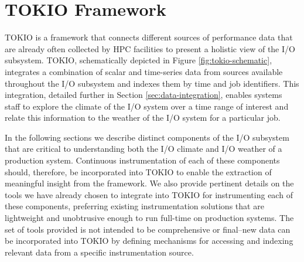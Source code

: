 \section{TOKIO Framework} \label{sec:methods}

TOKIO is a framework that connects different sources of performance data that are already often collected by HPC facilities to present a holistic view of the I/O subsystem.
TOKIO, schematically depicted in Figure \ref{fig:tokio-schematic}, integrates a combination of scalar and time-series data from sources available throughout the I/O subsystem and indexes them by time and job identifiers.
This integration, detailed further in Section
\ref{sec:data-integration}, enables systems staff to explore the
climate of the I/O system over a time range of interest and relate this
information to the weather of the I/O system for a particular job.

In the following sections we describe distinct components of the I/O subsystem that are critical to understanding both the I/O climate and I/O weather of a production system.
Continuous instrumentation of each of these components should, therefore, be incorporated into TOKIO to enable the extraction of meaningful insight from the framework.
We also provide pertinent details on the tools we have already chosen to integrate into TOKIO for instrumenting each of these components, preferring existing instrumentation solutions that are lightweight and unobtrusive enough to run full-time on production systems.
The set of tools provided is not intended to be comprehensive or final--new data can be incorporated into TOKIO by defining mechanisms for accessing and indexing relevant data from a specific instrumentation source.

